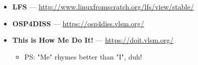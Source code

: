 \begin{frame}[fragile]
\begin{itemize}
\begin{itemize}
{                 \href{https://rms46.vlsm.org/2/198.pdf}{\texttt{198.pdf} (W03)},
                 \href{https://rms46.vlsm.org/2/199.pdf}{\texttt{199.pdf} (W04)},
                 \href{https://rms46.vlsm.org/2/200.pdf}{\texttt{200.pdf} (W05)},\\
                 \href{https://rms46.vlsm.org/2/201.pdf}{\texttt{201.pdf} (W06)},
                 \href{https://rms46.vlsm.org/2/202.pdf}{\texttt{202.pdf} (W07)},
                 \href{https://rms46.vlsm.org/2/203.pdf}{\texttt{203.pdf} (W08)},
                 \href{https://rms46.vlsm.org/2/204.pdf}{\texttt{204.pdf} (W09)},
                 \href{https://rms46.vlsm.org/2/205.pdf}{\texttt{205.pdf} (W10)}.}
\item[$\square$] \textbf{LFS} --- \url{http://www.linuxfromscratch.org/lfs/view/stable/}
\item[$\square$] \textbf{OSP4DISS} --- \url{https://osp4diss.vlsm.org/}
\item[$\square$] \textbf{This is How Me Do It!} --- \url{https://doit.vlsm.org/}
\begin{itemize}
\item[$\square$] PS: "Me" rhymes better than "I", duh!
\end{itemize}
\end{itemize}
\end{itemize}
\end{frame}

